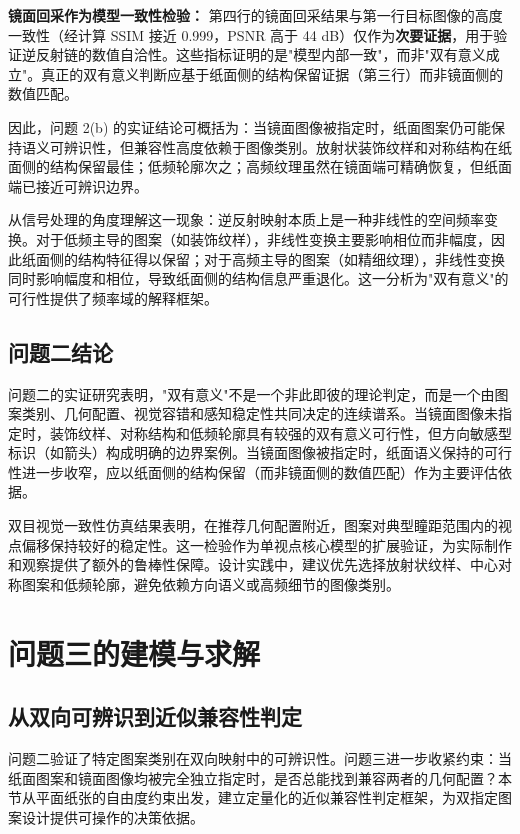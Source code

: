 \documentclass[a4paper,12pt]{ctexart}
\begin{document}
\par \textbf{镜面回采作为模型一致性检验：} 第四行的镜面回采结果与第一行目标图像的高度一致性（经计算 SSIM 接近 0.999，PSNR 高于 44 dB）仅作为\textbf{次要证据}，用于验证逆反射链的数值自洽性。这些指标证明的是"模型内部一致"，而非"双有意义成立"。真正的双有意义判断应基于纸面侧的结构保留证据（第三行）而非镜面侧的数值匹配。

\par 因此，问题 2(b) 的实证结论可概括为：当镜面图像被指定时，纸面图案仍可能保持语义可辨识性，但兼容性高度依赖于图像类别。放射状装饰纹样和对称结构在纸面侧的结构保留最佳；低频轮廓次之；高频纹理虽然在镜面端可精确恢复，但纸面端已接近可辨识边界。

\par 从信号处理的角度理解这一现象：逆反射映射本质上是一种非线性的空间频率变换。对于低频主导的图案（如装饰纹样），非线性变换主要影响相位而非幅度，因此纸面侧的结构特征得以保留；对于高频主导的图案（如精细纹理），非线性变换同时影响幅度和相位，导致纸面侧的结构信息严重退化。这一分析为"双有意义"的可行性提供了频率域的解释框架。

\subsection{问题二结论}
\par 问题二的实证研究表明，"双有意义"不是一个非此即彼的理论判定，而是一个由图案类别、几何配置、视觉容错和感知稳定性共同决定的连续谱系。当镜面图像未指定时，装饰纹样、对称结构和低频轮廓具有较强的双有意义可行性，但方向敏感型标识（如箭头）构成明确的边界案例。当镜面图像被指定时，纸面语义保持的可行性进一步收窄，应以纸面侧的结构保留（而非镜面侧的数值匹配）作为主要评估依据。
\par 双目视觉一致性仿真结果表明，在推荐几何配置附近，图案对典型瞳距范围内的视点偏移保持较好的稳定性。这一检验作为单视点核心模型的扩展验证，为实际制作和观察提供了额外的鲁棒性保障。设计实践中，建议优先选择放射状纹样、中心对称图案和低频轮廓，避免依赖方向语义或高频细节的图像类别。

\section{问题三的建模与求解}

\subsection{从双向可辨识到近似兼容性判定}
\par 问题二验证了特定图案类别在双向映射中的可辨识性。问题三进一步收紧约束：当纸面图案和镜面图像均被完全独立指定时，是否总能找到兼容两者的几何配置？本节从平面纸张的自由度约束出发，建立定量化的近似兼容性判定框架，为双指定图案设计提供可操作的决策依据。
\end{document}
